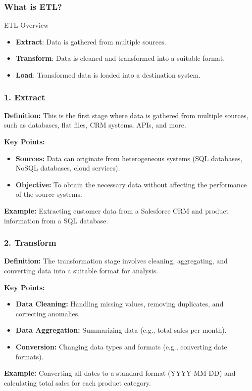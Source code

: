 \documentclass[aspectratio=169]{beamer}
\begin{document}
\begin{frame}[fragile]
    \frametitle{What is ETL?}
    \begin{block}{ETL Overview}
        \begin{itemize}
            \item \textbf{Extract}: Data is gathered from multiple sources.
            \item \textbf{Transform}: Data is cleaned and transformed into a suitable format.
            \item \textbf{Load}: Transformed data is loaded into a destination system.
        \end{itemize}
    \end{block}
\end{frame}

\begin{frame}[fragile]
    \frametitle{1. Extract}
    \textbf{Definition:} This is the first stage where data is gathered from multiple sources, such as databases, flat files, CRM systems, APIs, and more.

    \textbf{Key Points:}
    \begin{itemize}
        \item \textbf{Sources:} Data can originate from heterogeneous systems (SQL databases, NoSQL databases, cloud services).
        \item \textbf{Objective:} To obtain the necessary data without affecting the performance of the source systems.
    \end{itemize}

    \textbf{Example:} Extracting customer data from a Salesforce CRM and product information from a SQL database.
\end{frame}

\begin{frame}[fragile]
    \frametitle{2. Transform}
    \textbf{Definition:} The transformation stage involves cleaning, aggregating, and converting data into a suitable format for analysis.

    \textbf{Key Points:}
    \begin{itemize}
        \item \textbf{Data Cleaning:} Handling missing values, removing duplicates, and correcting anomalies.
        \item \textbf{Data Aggregation:} Summarizing data (e.g., total sales per month).
        \item \textbf{Conversion:} Changing data types and formats (e.g., converting date formats).
    \end{itemize}

    \textbf{Example:} Converting all dates to a standard format (YYYY-MM-DD) and calculating total sales for each product category.
\end{frame}
\end{document}
